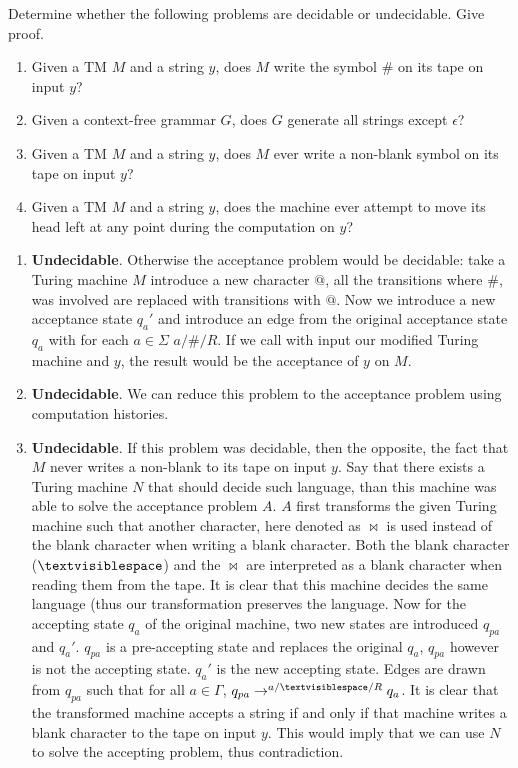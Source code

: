 \documentclass{article}
\begin{document}
\begin{exercise}
Determine whether the following problems are decidable or undecidable. Give proof.
\begin{enumerate}
 \item Given a TM $M$ and a string $y$, does $M$ write the symbol $\#$ on its tape on input $y$?
 \item Given a context-free grammar $G$, does $G$ generate all strings except $\epsilon$?
 \item Given a TM $M$ and a string $y$, does $M$ ever write a non-blank symbol on its tape on input $y$?
 \item Given a TM $M$ and a string $y$, does the machine ever attempt to move its head left at any point during the computation on $y$?
\end{enumerate}
\begin{answer}
\begin{enumerate}
 \item \textbf{Undecidable}. Otherwise the acceptance problem would be decidable: take a Turing machine $M$ introduce a new character $@$, all the transitions where $\#$, was involved are replaced with transitions with $@$. Now we introduce a new acceptance state $q_a'$ and introduce an edge from the original acceptance state $q_a$ with for each $a\in\Sigma$ $a/\#/R$. If we call with input our modified Turing machine and $y$, the result would be the acceptance of $y$ on $M$.
 \item \textbf{Undecidable}. We can reduce this problem to the acceptance problem using computation histories.
 \item \textbf{Undecidable}. If this problem was decidable, then the opposite, the fact that $M$ never writes a non-blank to its tape on input $y$. Say that there exists a Turing machine $N$ that should decide such language, than this machine was able to solve the acceptance problem $A$. $A$ first transforms the given Turing machine such that another character, here denoted as $\bowtie$ is used instead of the blank character when writing a blank character. Both the blank character ($\textvisiblespace$) and the $\bowtie$ are interpreted as a blank character when reading them from the tape. It is clear that this machine decides the same language (thus our transformation preserves the language. Now for the accepting state $q_a$ of the original machine, two new states are introduced $q_{pa}$ and $q_a'$. $q_{pa}$ is a pre-accepting state and replaces the original $q_a$, $q_{pa}$ however is not the accepting state. $q_a'$ is the new accepting state. Edges are drawn from $q_{pa}$ such that for all $a\in\Gamma$, $q_{pa}\rightarrow^{a/\textvisiblespace/R}q_a$. It is clear that the transformed machine accepts a string if and only if that machine writes a blank character to the tape on input $y$. This would imply that we can use $N$ to solve the accepting problem, thus contradiction.

\end{enumerate}
\end{answer}
\end{exercise}
\end{document}
